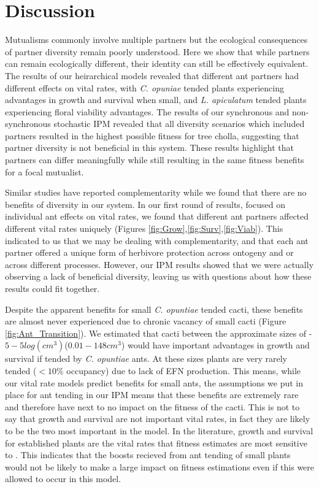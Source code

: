 \documentclass[11pt]{article}
\begin{document}
\section*{Discussion}
Mutualisms commonly involve multiple partners but the ecological consequences of partner diversity remain poorly understood. 
Here we show that while partners can remain ecologically different, their identity can still be effectively equivalent.
The results of our heirarchical models revealed that different ant partners had different effects on vital rates, with \textit{C. opuniae} tended plants experiencing advantages in growth and survival when small, and \textit{L. apiculatum} tended plants experiencing floral viability advantages.
The results of our synchronous and non-synchronous stochastic IPM revealed that all diversity scenarios which included partners resulted in the highest possible fitness for tree cholla, suggesting that partner diversity is not beneficial in this system. 
These results highlight that partners can differ meaningfully while still resulting in the same fitness benefits for a focal mutualist.

Similar studies have reported complementarity \citep{Palmer2010,Rezende2007,Hooper2005,Cardinale2007,Afkhami2021} while we found that there are no benefits of diversity in our system. 
In our first round of results, focused on individual ant effects on vital rates, we found that different ant partners affected different vital rates uniquely (Figures \ref{fig:Grow},\ref{fig:Surv},\ref{fig:Viab}).
This indicated to us that we may be dealing with complementarity, and that each ant partner offered a unique form of herbivore protection across ontogeny and or across different processes. 
However, our IPM results showed that we were actually observing a lack of beneficial diversity, leaving us with questions about how these results could fit together. 

Despite the apparent benefits for small \textit{C. opuntiae} tended cacti, these benefits are almost never experienced due to chronic vacancy of small cacti (Figure \ref{fig:Ant_Transition}).
We estimated that cacti between the approximate sizes of -$5 - 5 log(cm^3)$($0.01 - 148 cm^3$) would have important advantages in growth and survival if tended by \textit{C. opuntiae} ants.
At these sizes plants are very rarely tended ($< 10\%$ occupancy) due to lack of EFN production.
This means, while our vital rate models predict benefits for small ants, the assumptions we put in place for ant tending in our IPM means that these benefits are extremely rare and therefore have next to no impact on the fitness of the cacti.
This is not to say that growth and survival are not important vital rates, in fact they are likely to be the two most important in the model. 
In the literature, growth and survival for established plants are the vital rates that fitness estimates are most sensitive to \cite{Eacker2017}.
This indicates that the boosts recieved from ant tending of small plants would not be likely to make a large impact on fitness estimations even if this were allowed to occur in this model.
\end{document}
